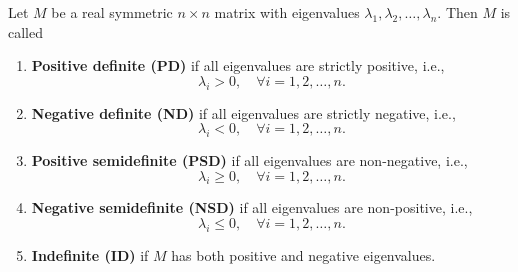 \begin{definition}\label{def:definiteness-of-matrix}
	Let \( M \) be a real symmetric \( n \times n \) matrix with eigenvalues \( \lambda_1, \lambda_2, \ldots, \lambda_n \). Then \( M \) is called

	\begin{enumerate}
		\item \textbf{Positive definite (PD)} if all eigenvalues are strictly positive, i.e.,
		      \begin{equation}
			      \lambda_i > 0, \quad \forall i = 1, 2, \ldots, n.
			      \label{eq:definiteness-1}
		      \end{equation}

		\item \textbf{Negative definite (ND)} if all eigenvalues are strictly negative, i.e.,
		      \begin{equation}
			      \lambda_i < 0, \quad \forall i = 1, 2, \ldots, n.
			      \label{eq:definiteness-2}
		      \end{equation}

		\item \textbf{Positive semidefinite (PSD)} if all eigenvalues are non-negative, i.e.,
		      \begin{equation}
			      \lambda_i \geq 0, \quad \forall i = 1, 2, \ldots, n.
			      \label{eq:definiteness-3}
		      \end{equation}

		\item \textbf{Negative semidefinite (NSD)} if all eigenvalues are non-positive, i.e.,
		      \begin{equation}
			      \lambda_i \leq 0, \quad \forall i = 1, 2, \ldots, n.
			      \label{eq:definiteness-4}
		      \end{equation}

		\item \textbf{Indefinite (ID)} if \( M \) has both positive and negative eigenvalues.
	\end{enumerate}
\end{definition}


